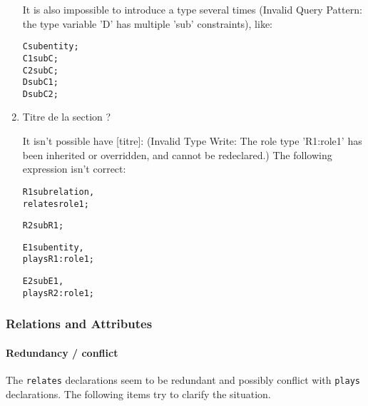 \documentclass{article}
\begin{document}
\begin{enumerate}
It is also impossible to introduce a type several times (Invalid Query Pattern: the type variable 'D' has multiple 'sub' constraints), like:

  \begin{alltt}
    C sub entity;
    C1 sub C;
    C2 sub C;
    D sub C1;
    D sub C2;
  \end{alltt}


\item Titre de la section ?

It isn't possible have [titre]: (Invalid Type Write: The role type 'R1:role1' has been inherited or overridden, and cannot be redeclared.) The following expression isn't correct:

\begin{alltt}
     R1 sub relation,
     relates role1;
    
     R2 sub R1;
      
    E1 sub entity,
    plays R1:role1;
    
    E2 sub E1,
    plays R2:role1;
  \end{alltt}

\end{enumerate}


\subsubsection{Relations and Attributes}



\paragraph{Redundancy / conflict} The \texttt{relates} declarations seem to be redundant and possibly conflict with \texttt{plays} declarations. The following items try to clarify the situation.
\end{document}
